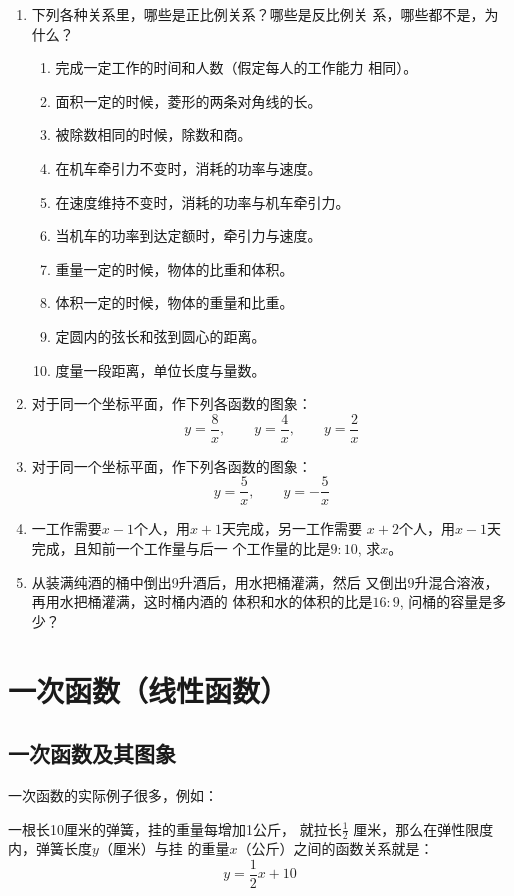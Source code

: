 \begin{ex}
\begin{enumerate}
    \item 下列各种关系里，哪些是正比例关系？哪些是反比例关
    系，哪些都不是，为什么？
    \begin{enumerate}
    \item 完成一定工作的时间和人数（假定每人的工作能力
    相同）。
    \item 面积一定的时候，菱形的两条对角线的长。
    \item 被除数相同的时候，除数和商。
    \item 在机车牵引力不变时，消耗的功率与速度。
    \item 在速度维持不变时，消耗的功率与机车牵引力。
    \item 当机车的功率到达定额时，牵引力与速度。
    \item 重量一定的时候，物体的比重和体积。
    \item 体积一定的时候，物体的重量和比重。
    \item 定圆内的弦长和弦到圆心的距离。
    \item 度量一段距离，单位长度与量数。        
    \end{enumerate}

    \item 对于同一个坐标平面，作下列各函数的图象：
    \[y=\frac{8}{x},\qquad y=\frac{4}{x},\qquad y=\frac{2}{x}\]
    \item  对于同一个坐标平面，作下列各函数的图象：
    \[y=\frac{5}{x},\qquad y=-\frac{5}{x}\]
    \item 一工作需要$x-1$个人，用$x+1$天完成，另一工作需要
    $x+2$个人，用$x-1$天完成，且知前一个工作量与后一
    个工作量的比是$9:10$, 求$x$。
\item 从装满纯酒的桶中倒出9升酒后，用水把桶灌满，然后
又倒出9升混合溶液，再用水把桶灌满，这时桶内酒的
体积和水的体积的比是$16:9$, 问桶的容量是多少？
\end{enumerate}
\end{ex}

\section{一次函数（线性函数）}
\subsection{一次函数及其图象}
一次函数的实际例子很多，例如：


\begin{example}
一根长10厘米的弹簧，挂的重量每增加1公斤，
就拉长$\frac{1}{2}$
厘米，那么在弹性限度内，弹簧长度$y$（厘米）与挂
的重量$x$（公斤）之间的函数关系就是：
\begin{equation}
    y=\frac{1}{2}x+10
\end{equation}
\end{example}



